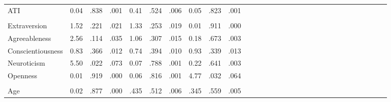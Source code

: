 \documentclass[authordate, empirical,issue]{jote-new-article}
\begin{document}
\begin{table}[t]
\begin{fullwidth}
\begin{tabular}{@{} l l l l l l l l l l l l l l l l l l l l l l l l l l l l l l @{}}
      ATI                     & 0.04                                            & .838                                  & .001                & 0.41  & .524 & .006                & 0.05 & .823 & .001                \\

                              &                                                 &                                       &                     &       &      &                     &      &      &                     \\

      Extraversion            & 1.52                                            & .221                                  & .021                & 1.33  & .253 & .019                & 0.01 & .911 & .000
      \\

      Agreeableness           & 2.56                                            & .114                                  & .035                & 1.06  & .307 & .015                & 0.18 & .673 & .003
      \\

      Conscientiousness       & 0.83                                            & .366                                  & .012                & 0.74  & .394 & .010                & 0.93 & .339
                              & .013                                                                                                                                                                                   \\

      Neuroticism             & 5.50                                            & .022                                  & .073                & 0.07  & .788 & .001                & 0.22 & .641 & .003
      \\

      Openness                & 0.01                                            & .919                                  & .000                & 0.06  & .816 & .001                & 4.77 & .032 & .064                \\

                              &                                                 &                                       &                     &       &      &                     &      &      &                     \\

      Age                     & 0.02                                            & .877                                  & .000                & .435  & .512 & .006                & .345 & .559 & .005                \\


\end{tabular}
\end{fullwidth}
\end{table}
\end{document}

